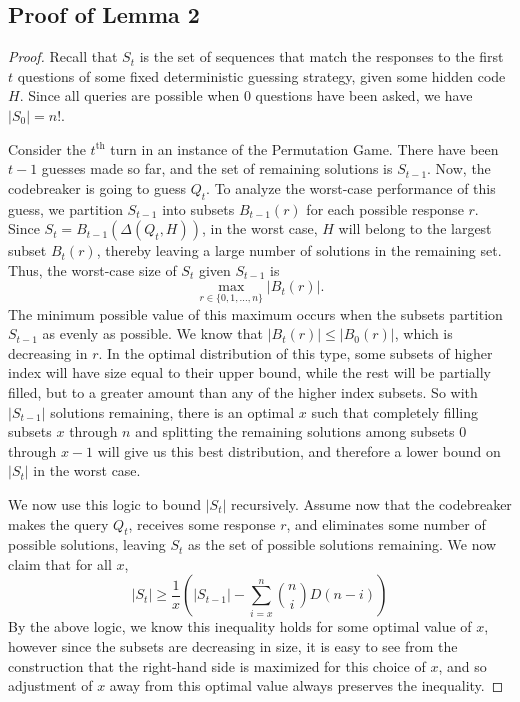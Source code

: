 \documentclass[12pt, a4paper]{article}
\newcommand{\nth}{^{\text{th}}}       %
\begin{document}
		 \subsection{Proof of Lemma 2}
		 \begin{proof}[Proof] 
		 Recall that $S_t$ is the set of sequences that match the responses to the first $t$ questions of some fixed deterministic guessing strategy, given some hidden code $H$. Since all queries are possible when 0 questions have been asked, we have $|S_0| = n!$.
		 
		 Consider the $t\nth$ turn in an instance of the Permutation Game. There have been $t-1$ guesses made so far, and the set of remaining solutions is $S_{t-1}$. Now, the codebreaker is going to guess $Q_t$. To analyze the worst-case performance of this guess, we partition $S_{t-1}$ into subsets $ B_{t-1}(r)$ for each possible response $r$. Since $S_t = B_{t-1}(\Delta(Q_t,H))$, in the worst case, $H$ will belong to the largest subset $B_t(r)$, thereby leaving a large number of solutions in the remaining set. Thus, the worst-case size of $S_t$ given $S_{t-1}$ is
		 \begin{equation*}
			\max_{r\in\{0,1,\ldots,n\}}|B_{t}(r)|.
		 \end{equation*}
		 The minimum possible value of this maximum occurs when the subsets partition $S_{t-1}$ as evenly as possible. We know that $|B_t(r)| \leq |B_0(r)|$, which is decreasing in $r$. In the optimal distribution of this type, some subsets of higher index will have size equal to their upper bound, while the rest will be partially filled, but to a greater amount than any of the higher index subsets. So with $|S_{t-1}|$ solutions remaining, there is an optimal $x$ such that completely filling subsets $x$ through $n$ and splitting the remaining solutions among subsets 0 through $x-1$ will give us this best distribution, and therefore a lower bound on $|S_t|$ in the worst case.
		 
		We now use this logic to bound $|S_t|$ recursively. Assume now that the codebreaker makes the query $Q_t$, receives some response $r$, and eliminates some number of possible solutions, leaving $S_t$ as the set of possible solutions remaining. We now claim that for all $x$,
		\begin{equation}
		|S_t| \ge \frac 1x \left(|S_{t-1}|-\sum_{i = x}^{n}\binom{n}{i}D(n-i)\right)
		\end{equation}
		By the above logic, we know this inequality holds for some optimal value of $x$, however since the subsets are decreasing in size, it is easy to see from the construction that the right-hand side is maximized for this choice of $x$, and so adjustment of $x$ away from this optimal value always preserves the inequality.
		

\end{proof}
\end{document}
